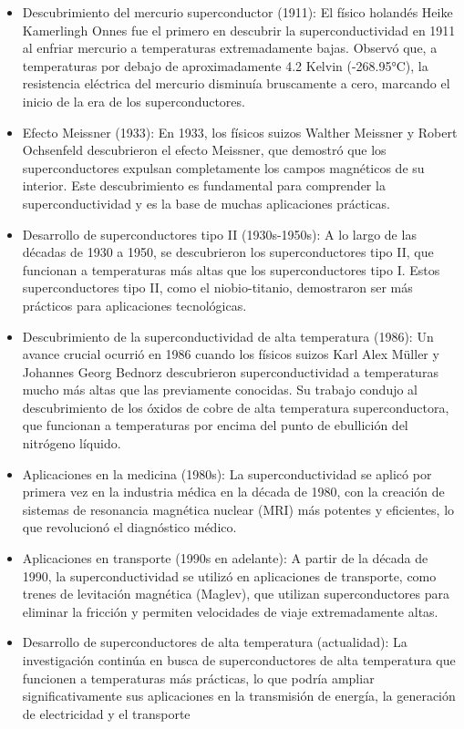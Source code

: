 \documentclass[10.5pt]{article}
\begin{document}
    \begin{itemize}
        \item Descubrimiento del mercurio superconductor (1911): El físico holandés Heike Kamerlingh Onnes fue el primero en descubrir la superconductividad en 1911 al enfriar mercurio a temperaturas extremadamente bajas. Observó que, a temperaturas por debajo de aproximadamente 4.2 Kelvin (-268.95°C), la resistencia eléctrica del mercurio disminuía bruscamente a cero, marcando el inicio de la era de los superconductores.
        \item Efecto Meissner (1933): En 1933, los físicos suizos Walther Meissner y Robert Ochsenfeld descubrieron el efecto Meissner, que demostró que los superconductores expulsan completamente los campos magnéticos de su interior. Este descubrimiento es fundamental para comprender la superconductividad y es la base de muchas aplicaciones prácticas.
        \item Desarrollo de superconductores tipo II (1930s-1950s): A lo largo de las décadas de 1930 a 1950, se descubrieron los superconductores tipo II, que funcionan a temperaturas más altas que los superconductores tipo I. Estos superconductores tipo II, como el niobio-titanio, demostraron ser más prácticos para aplicaciones tecnológicas.
        \item Descubrimiento de la superconductividad de alta temperatura (1986): Un avance crucial ocurrió en 1986 cuando los físicos suizos Karl Alex Müller y Johannes Georg Bednorz descubrieron superconductividad a temperaturas mucho más altas que las previamente conocidas. Su trabajo condujo al descubrimiento de los óxidos de cobre de alta temperatura superconductora, que funcionan a temperaturas por encima del punto de ebullición del nitrógeno líquido.
        \item Aplicaciones en la medicina (1980s): La superconductividad se aplicó por primera vez en la industria médica en la década de 1980, con la creación de sistemas de resonancia magnética nuclear (MRI) más potentes y eficientes, lo que revolucionó el diagnóstico médico.
        \item Aplicaciones en transporte (1990s en adelante): A partir de la década de 1990, la superconductividad se utilizó en aplicaciones de transporte, como trenes de levitación magnética (Maglev), que utilizan superconductores para eliminar la fricción y permiten velocidades de viaje extremadamente altas.
        \item Desarrollo de superconductores de alta temperatura (actualidad): La investigación continúa en busca de superconductores de alta temperatura que funcionen a temperaturas más prácticas, lo que podría ampliar significativamente sus aplicaciones en la transmisión de energía, la generación de electricidad y el transporte
    \end{itemize}
\end{document}
